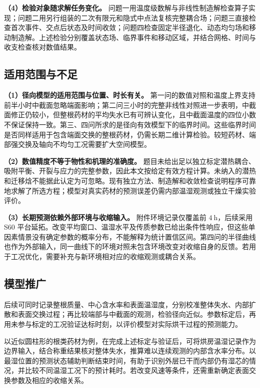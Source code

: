 \documentclass[UTF8,a4paper]{ctexart}
\begin{document}
\noindent\textbf{（4）检验对象随求解任务变化。}
问题一用温度级数解与非线性制造解检查算子实现；问题二用另行组装的二次有限元和隐式中点法复核完整耦合场；问题三直接检查首次事件、交点后状态及时间收敛；问题四检查固定半径退化、动态均匀场和移动制造解。上述检验分别覆盖状态场、临界事件和移动区域，并结合网格、时间与收支检查核对数值结果。

\subsection{适用范围与不足}

\noindent\textbf{（1）径向模型的适用范围与位置、时长有关。}
第一问的数值对照和温度上界支持前半小时中截面忽略端面影响；第二问三小时的完整非线性对照进一步表明，中截面修正仍较小，但整根药材的平均失水已有可辨认变化，且中截面温度的四位小数不保证保持一致。第三、四问所求的是径向有效模型下的临界时间。这些临界时间是否同样适用于包含端面交换的整根药材，仍需长期二维计算检验。较短药材、端部强交换及轴向不均匀工况需要扩大空间模型。

\noindent\textbf{（2）数值精度不等于物性和机理的准确度。}
题目未给出足以独立标定潜热耦合、吸附平衡、开裂与应力的完整参数，因此本文按给定有效方程计算。未纳入的潜热和迁移焓不能据此认定为可忽略。现有独立方法、制造解和收敛检查说明程序可靠地求解了所选方程；模型对真实药材的预测误差仍需内部温湿观测或独立干燥实验评价。

\noindent\textbf{（3）长期预测依赖外部环境与收缩输入。}
附件环境记录仅覆盖前 \(4~\mathrm h\)，后续采用 S60 平台延拓。改变平均窗口、温湿水平及传质参数已给出条件性响应，但这些单因素情景没有确定参数的概率分布，不能解释为统计置信区间。第四问的半径曲线也作为外部输入，同一曲线下的环境对照未包含环境改变对收缩自身的反馈。若用于工况优化，需要补充与新环境相对应的收缩观测或耦合关系。

\subsection{模型推广}

后续可同时记录整根质量、中心含水率和表面温湿度，分别校准整体失水、内部扩散和表面交换过程；再比较端部与中截面的观测，检验径向近似。参数标定后，再用未参与标定的工况验证达标时刻，以评价模型对实际烘干过程的预测能力。

以近似圆柱形的根类药材为例，在完成上述标定与验证后，可将烘房温湿记录作为边界输入，结合称重结果核对整体失水，推算难以连续观测的内部含水率分布。以最湿位置的预测状态辅助判断结束时间，有助于识别外层已干而内部仍有湿芯的情况，并比较不同温湿工况下的预计耗时。若改变风速等条件，还需重新确定表面交换参数及相应的收缩关系。
\end{document}
